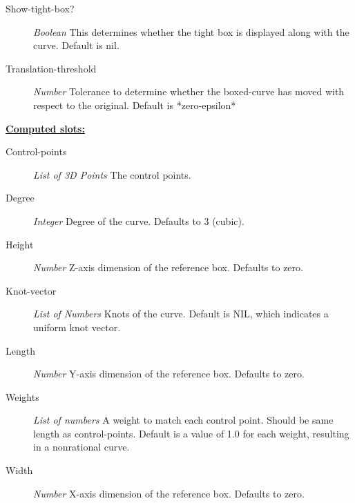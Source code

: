 \documentclass [11pt]{book}
\begin{document}
\begin{itemize}
\begin{description}
\item [Show-tight-box?]
\emph{Boolean} This determines whether the tight box is displayed along with the curve. Default is nil.


\item [Translation-threshold]
\emph{Number} Tolerance to determine whether the boxed-curve has
moved with respect to the original. Default is *zero-epsilon*


\end{description}






\textbf{
\underline{Computed slots:}}

\begin{description}

\item [Control-points]
\emph{List of 3D Points} The control points.


\item [Degree]
\emph{Integer} Degree of the curve. Defaults to 3 (cubic).


\item [Height]
\emph{Number} Z-axis dimension of the reference box. Defaults to zero.


\item [Knot-vector]
\emph{List of Numbers} Knots of the curve. Default is NIL, which indicates a uniform knot vector.


\item [Length]
\emph{Number} Y-axis dimension of the reference box. Defaults to zero.


\item [Weights]
\emph{List of numbers} A weight to match each control point. Should be same length as control-points.
Default is a value of 1.0 for each weight, resulting in a nonrational curve.


\item [Width]
\emph{Number} X-axis dimension of the reference box. Defaults to zero.


\end{description}








\end{itemize}
\end{document}
